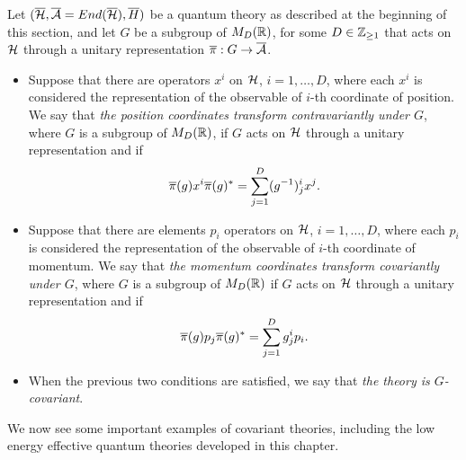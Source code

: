 \begin{definition}\label{definitionGActsCovariantlyOnCoordinates}
Let $(\overline{\mathcal H}, \overline{\mathcal A} = End(\overline{\mathcal H}), \overline{H})$ be a quantum theory as described at the beginning of this section, and let $G$ be a subgroup of $M_D(\mathbb{R})$, for some $D \in \mathbb{Z}_{\geq 1}$ that acts on $\mathcal H$ through a unitary representation $\overline{\pi}: G \to \overline{\mathcal A}$.
    \begin{itemize}
        
        \item Suppose that there are operators $x^i$ on $\mathcal H$, $i = 1, \dots, D$, where each $x^i$ is considered the representation of the observable of $i$-th coordinate of position. We say that \emph{the position coordinates transform contravariantly under $G$}, where $G$ is a subgroup of $M_D(\mathbb{R})$, if $G$ acts on $\mathcal H$ through a unitary representation and if 
        \begin{equation}
            \overline{\pi}(g) x^i \overline{\pi}(g)^* = \sum_{j = 1}^D (g^{-1})^i_j x^j.
        \end{equation}
        
        \item Suppose that there are elements $p_i$ operators on $\mathcal H$, $i = 1, \dots, D$, where each $p_i$ is considered the representation of the observable of $i$-th coordinate of momentum. We say that \emph{the momentum coordinates transform covariantly under $G$}, where $G$ is a subgroup of $M_D(\mathbb{R})$ if $G$ acts on $\mathcal H$ through a unitary representation  and if 
        \begin{equation}
            \overline{\pi}(g) p_j \overline{\pi}(g)^* = \sum_{j = 1}^D g^i_j p_i.
        \end{equation}
    
    \item When the previous two conditions are satisfied, we say that \emph{the theory is $G$-covariant}.
    
    \end{itemize}
    \end{definition}

We now see some important examples of covariant theories, including the low energy effective quantum theories developed in this chapter.

